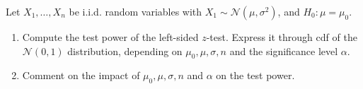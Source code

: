
\begin{exercise}

Let $X_1,\dots,X_n$ be i.i.d. random variables with $X_1 \sim \mathcal{N}(\mu,\sigma^2)$,
and $H_0: \mu = \mu_0$.

\begin{enumerate}[label = (\alph*)]
    \item Compute the test power of the left-sided $z$-test.
    Express it through cdf of the $\mathcal{N}(0,1)$ distribution, depending
    on $\mu_0,\mu,\sigma,n$ and the significance level $\alpha$.
    \item Comment on the impact of $\mu_0, \mu, \sigma, n$ and $\alpha$ on the test power.
\end{enumerate}

\end{exercise}


\begin{solution}

\phantom{}

\end{solution}

